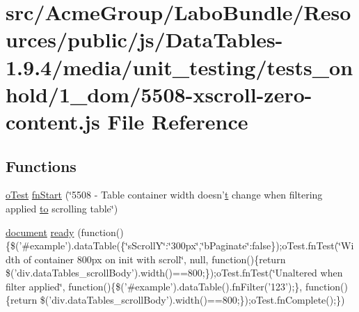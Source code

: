 \hypertarget{5508-xscroll-zero-content_8js}{\section{src/\+Acme\+Group/\+Labo\+Bundle/\+Resources/public/js/\+Data\+Tables-\/1.9.4/media/unit\+\_\+testing/tests\+\_\+onhold/1\+\_\+dom/5508-\/xscroll-\/zero-\/content.js File Reference}
\label{5508-xscroll-zero-content_8js}
}
\subsection*{Functions}
\begin{DoxyCompactItemize}
\item 
\hyperlink{unit__test_8js_a3b2d259e2df3b6860d9047a92d09d0d6}{o\+Test} \hyperlink{5508-xscroll-zero-content_8js_a228e7064404d2dbd0b870fef50c3e4b5}{fn\+Start} (\char`\"{}5508 -\/ Table container width doesn'\hyperlink{jquery_8knob_8js_aa09e7cf223942a40813c00a3897b7c48}{t} change when filtering applied \hyperlink{jquery-ui_8js_af6086621f45baa2cf538f19e45d3c263}{to} scrolling table\char`\"{})
\item 
\hyperlink{outside_events_8js_aa14f8e0338cced6720590fd2ea13bd4b}{document} \hyperlink{5508-xscroll-zero-content_8js_a66b150f8680d24d1d737d7ab56ea6c08}{ready} (function()\{\$('\#example').data\+Table(\{\char`\"{}s\+Scroll\+Y\char`\"{}\+:\char`\"{}300px\char`\"{},\char`\"{}b\+Paginate\char`\"{}\+:false\});o\+Test.\+fn\+Test(\char`\"{}\+Width of container 800px on init with scroll\char`\"{}, null, function()\{return \$('div.\+data\+Tables\+\_\+scroll\+Body').\+width()==800;\});o\+Test.\+fn\+Test(\char`\"{}\+Unaltered when filter applied\char`\"{}, function()\{\$('\#example').\+data\+Table().\+fn\+Filter('123');\}, function()\{return \$('div.\+data\+Tables\+\_\+scroll\+Body').\+width()==800;\});o\+Test.\+fn\+Complete();\})
\end{DoxyCompactItemize}


